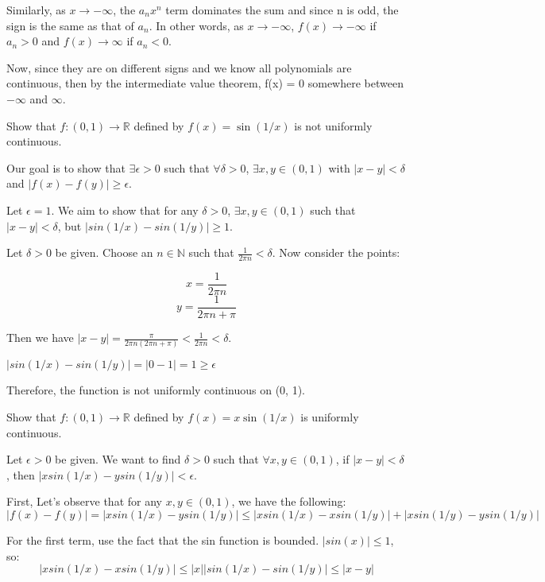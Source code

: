 \documentclass[answers]{exam}
\theoremstyle{remark}
\theoremstyle{definition}
\newcommand{\NN}{\mathbb{N}}
\newcommand{\RR}{\mathbb{R}}
\begin{document}
\begin{questions}
\begin{solution}
Similarly, as $x \to -\infty$, the $a_n x^n$ term dominates the sum
and since n is odd, the sign is the same as that of
$a_n$. In other words, as $x \to -\infty$,
$f(x) \to -\infty$ if $a_n > 0$ and $f(x) \to \infty$
if $a_n < 0$.

Now, since they are on different signs and we know all polynomials
are continuous, then by the intermediate value theorem,
f(x) = 0 somewhere between $-\infty$ and $\infty$.

\end{solution}

\question Show that $f:(0,1) \to \RR$ defined by $f(x)=\sin(1/x)$ is not uniformly continuous.
\begin{solution}

Our goal is to show that $\exists \epsilon > 0$
such that $\forall \delta > 0$,
$\exists x, y \in (0, 1)$
with $|x-y| < \delta$ and $|f(x) - f(y)| \geq \epsilon$.

Let $\epsilon = 1$. We aim to show that for any
$\delta > 0$, $\exists x, y \in (0, 1)$
such that $|x-y| < \delta$, but $|sin(1/x) - sin(1/y)| \geq 1$.

Let $\delta > 0$ be given. Choose an $n \in \NN$ such that
$\frac{1}{2 \pi n} < \delta$. Now consider the points:

\[x = \frac{1}{2 \pi n}\]
\[y = \frac{1}{2 \pi n + \pi}\]

Then we have $|x - y| = \frac{\pi}{2 \pi n (2 \pi n + \pi)} < \frac{1}{2 \pi n} < \delta$.

$|sin(1/x) - sin(1/y)| = |0 - 1| = 1 \geq \epsilon$

Therefore, the function is not uniformly continuous on (0, 1).

\end{solution}

\question Show that $f:(0,1) \to \RR$ defined by $f(x)=x \sin(1/x)$ is uniformly continuous.
\begin{solution}

Let $\epsilon > 0$ be given. We want to find $\delta > 0$
such that $\forall x, y \in (0, 1)$, if $|x-y| < \delta$,
then $|x sin(1/x) - y sin(1/y)| < \epsilon$.

First, Let's observe that for any $x, y \in (0, 1)$, we have the following:
\[|f(x) - f(y)| = |x sin(1/x) - y sin(1/y)| \leq |x sin(1/x) - x sin(1/y)| + |x sin(1/y) - y sin(1/y)|\]

For the first term, use the fact that the sin function is bounded.
$|sin(x)| \leq 1$, so:
\[|x sin(1/x) - x sin(1/y)| \leq |x| |sin(1/x) - sin(1/y)| \leq |x-y|\]


\end{solution}
\end{questions}
\end{document}

